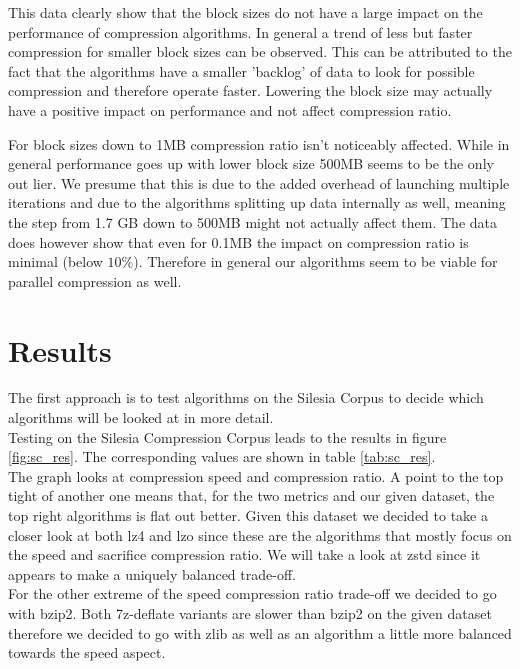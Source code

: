 \documentclass[
	12pt,
	a4paper,
	BCOR10mm,
	DIV14,
	listof=totoc,
	bibliography=totoc,
	headsepline
]{scrreprt}
\begin{document}

This data clearly show that the block sizes do not have a large impact on the performance of compression algorithms. 
In general a trend of less but faster compression for smaller block sizes can be observed.
This can be attributed to the fact that the algorithms have a smaller 'backlog' of data to look for possible compression and therefore operate faster.
Lowering the block size may actually have a positive impact on performance and not affect compression ratio.

For block sizes down to 1MB compression ratio isn't noticeably affected.
While in general performance goes up with lower block size 500MB seems to be the only out lier.
We presume that this is due to the added overhead of launching multiple iterations and due to the algorithms splitting up data internally as well, meaning the step from 1.7 GB down to 500MB might not actually affect them.
The data does however show that even for 0.1MB the impact on compression ratio is minimal (below $10\%$). 
Therefore in general our algorithms seem to be viable for parallel compression as well.

\FloatBarrier
\section{Results}
The first approach is to test algorithms on the Silesia Corpus to decide which algorithms will be looked at in more detail.
\\
Testing on the Silesia Compression Corpus leads to the results in figure \ref{fig:sc_res}. 
The corresponding values are shown in table \ref{tab:sc_res}. \\


The graph looks at compression speed and compression ratio. A point to the top tight of another one means that, for the two metrics and our given dataset, the top right algorithms is flat out better. Given this dataset we decided to take a closer look at both lz4 and lzo since these are the algorithms that mostly focus on the speed and sacrifice compression ratio. We will take a look at zstd since it appears to make a uniquely balanced trade-off. \\
For the other extreme of the speed compression ratio trade-off we decided to go with bzip2. Both 7z-deflate variants are slower than bzip2 on the given dataset therefore we decided to go with zlib as well as an algorithm a little more balanced towards the speed aspect.
\end{document}
